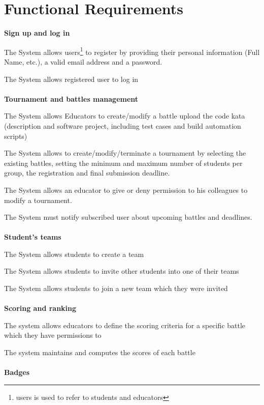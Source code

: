 \section{Functional Requirements}


\textbf{Sign up and log in}
\begin{enumerate}[label={[R\arabic*]}]
    
    \item The System allows users\footnote{users is used to refer to students and educators} to register by providing their personal information (Full Name, etc.), a valid email address and a password.
    \item The System allows registered user to log in
    \\  \\  \textbf{Tournament and battles management}
    \item The System allows Educators to create/modify a battle upload the code kata (description and software project, including test cases and build automation scripts)
    \item The System allows to create/modify/terminate a tournament by selecting the existing battles, setting the minimum and maximum number of students per group, the registration and final submission deadline.
    \item The System allows an educator to give or deny permission to his colleagues to modify a tournament.
    \item The System must notify subscribed user about upcoming battles and deadlines.
    \\  \\  \textbf{Student's teams}
    \item The System allows students to create a team
    \item The System allows students to invite other students into one of their teams
    \item The System allows students to join a new team which they were invited
    \\  \\  \textbf{Scoring and ranking}
    \item The system allows educators to define the scoring criteria for a specific battle which they have permissions to
    \item The system maintains and computes the scores of each battle
    \\ \\  \textbf{Badges}

\end{enumerate}
